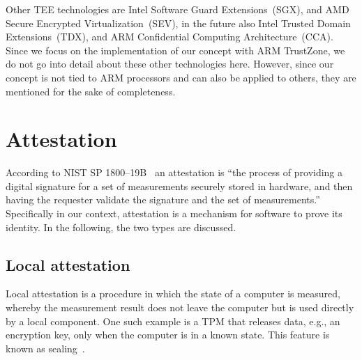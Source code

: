 Other \ac{TEE} technologies are Intel Software Guard Extensions~(SGX), and AMD Secure Encrypted Virtualization~(SEV), in the future also Intel Trusted Domain Extensions~(TDX), and ARM Confidential Computing Architecture~(CCA). Since we focus on the implementation of our concept with ARM TrustZone, we do not go into detail about these other technologies here. However, since our concept is not tied to ARM processors and can also be applied to others, they are mentioned for the sake of completeness.





\section{Attestation}


According to NIST SP 1800--19B~\cite{Bartock2022} an attestation is ``the process of providing a digital signature for a set of measurements securely stored in hardware, and then having the requester validate the signature and the set of measurements.''
Specifically in our context, attestation is a mechanism for software to prove its identity.
In the following, the two types are discussed.


\subsection{Local attestation}

Local attestation is a procedure in which the state of a computer is measured, whereby the measurement result does not leave the computer but is used directly by a local component. One such example is a \ac{TPM} that releases data, e.g., an encryption key, only when the computer is in a known state. This feature is known as sealing~\cite{tpm}.


